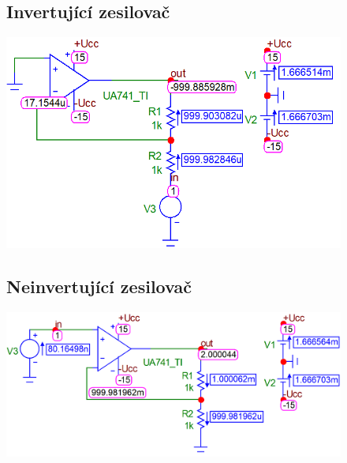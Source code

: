 \documentclass{article}
\begin{document}
\begin{figure}[H]
  \begin{minipage}[t]{0.48\textwidth}
    \subsection*{Invertující zesilovač}
    \includegraphics[width=\textwidth]{PC/Dynamic_DC/in.png}
  \end{minipage}
  \hfill
  \begin{minipage}[t]{0.48\textwidth}
    \subsection*{Neinvertující zesilovač}
    \includegraphics[width=\textwidth]{PC/Dynamic_DC/nein.png}
  \end{minipage}
\end{figure}
\end{document}
